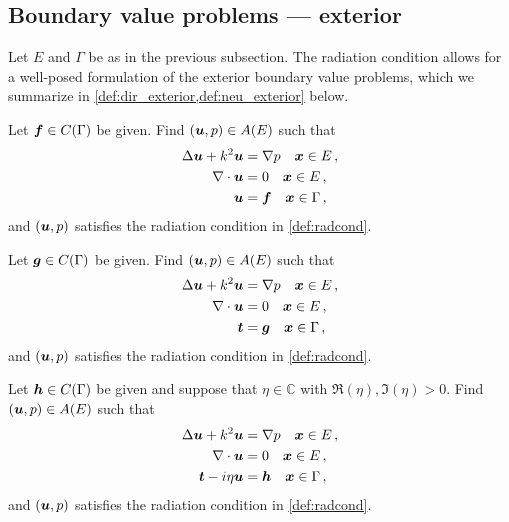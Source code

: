 \subsection{Boundary value problems --- exterior}

Let $E$ and $\Gamma$ be as in the previous subsection.
The radiation condition allows for a well-posed formulation
of the exterior boundary value problems, which we
summarize in
\cref{def:dir_exterior,def:neu_exterior} below.

\begin{definition}
  \label{def:dir_exterior}
  Let ${\boldsymbol f} \in C(\Gamma)$ be given. Find $({\boldsymbol u},p) \in A(E)$
  such that
  \begin{equation}
  \begin{aligned} \label{eq:dir_exterior}
    \Delta {\boldsymbol u} + k^{2} {\boldsymbol u} &= \nabla p \quad {\boldsymbol x} \in E \, ,\\
    \nabla \cdot {\boldsymbol u} &= 0 \quad {\boldsymbol x} \in E \, ,  \\
    {\boldsymbol u} &= {\boldsymbol f} \quad {\boldsymbol x} \in \Gamma \, , 
  \end{aligned}
  \end{equation}
  and $({\boldsymbol u},p)$ satisfies the radiation condition in
  \cref{def:radcond}.
\end{definition}
\begin{definition}
  \label{def:neu_exterior}  
  Let ${\boldsymbol g} \in C(\Gamma)$ be given. Find $({\boldsymbol u},p) \in A(E)$
  such that
  \begin{equation}
  \begin{aligned} \label{eq:neu_exterior}
    \Delta {\boldsymbol u} + k^{2} {\boldsymbol u} &= \nabla p \quad {\boldsymbol x} \in E \, ,\\
    \nabla \cdot {\boldsymbol u} &= 0 \quad {\boldsymbol x} \in E \, ,  \\
    {\boldsymbol t} &= {\boldsymbol g} \quad {\boldsymbol x} \in \Gamma \, ,
  \end{aligned}
  \end{equation}
  and $({\boldsymbol u},p)$ satisfies the radiation condition in
  \cref{def:radcond}.
\end{definition}

\begin{definition}
  \label{def:neu_exterior}  
  Let ${\boldsymbol h} \in C(\Gamma)$ be given and suppose that
  $\eta \in \mathbb{C}$ with $\Re{(\eta)},\Im{(\eta)} >0$. 
  Find $({\boldsymbol u},p) \in A(E)$
  such that
  \begin{equation}
  \begin{aligned} \label{eq:neu_exterior}
    \Delta {\boldsymbol u} + k^{2} {\boldsymbol u} &= \nabla p \quad {\boldsymbol x} \in E \, ,\\
    \nabla \cdot {\boldsymbol u} &= 0 \quad {\boldsymbol x} \in E \, ,  \\
    {\boldsymbol t} - i\eta {\boldsymbol u} &= {\boldsymbol h} \quad {\boldsymbol x} \in \Gamma \, ,
  \end{aligned}
  \end{equation}
  and $({\boldsymbol u},p)$ satisfies the radiation condition in
  \cref{def:radcond}.
\end{definition}


